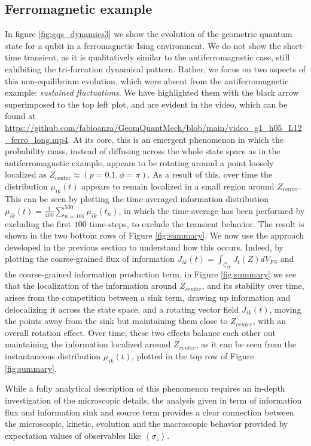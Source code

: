 \documentclass[draft,nofootinbib,pre,twocolumn,showpacs,showkeys,preprintnumbers,floatfix]{revtex4-1}
\newcommand{\CC}[2]{\mathcal{C}_{#1 #2}}
\newcommand{\1}{\mathbbm{1}}
\newcommand{\MV}[1]{\left\langle #1 \right\rangle}
\begin{document}
\subsection*{Ferromagnetic example}
In figure \ref{fig:gqs_dynamics3} we show the evolution of the geometric
quantum state for a qubit in a ferromagnetic Ising environment. We do not
show the short-time transient, as it is qualitatively similar to the antiferromagnetic case,
still exhibiting the tri-furcation dynamical pattern. Rather, we focus on two aspects
of this non-equilibrium evolution, which were absent from the antiferromagnetic example: \emph{sustained 
fluctuations}. We have highlighted them with the black arrow superimposed to the top left
plot, and are evident in the video, which can be found at
\url{https://github.com/fabioanza/GeomQuantMech/blob/main/video_g1_h05_L12_ferro_long.mp4}.
At its core, this is an emergent phenomenon in which the probability mass, instead of
diffusing across the whole state space as in the antiferromagnetic example, appears to be 
rotating around a point loosely localized as $Z_{\mathrm{center}} \approx (p=0.1,\phi=\pi)$. 
As a result of this, over time the distribution $\mu_{ik}(t)$ appears to remain localized in 
a small region around $Z_{\mathrm{center}}$. This can be seen by plotting the time-averaged
information distribution $\overline{\mu_{ik}(t)} = \frac{1}{400}\sum_{n=101}^{500} \mu_{ik}(t_n)$, 
in which the time-average has been performed by excluding the first $100$ time-steps, to 
exclude the transient behavior. The result is shown in the two bottom rows of Figure \ref{fig:summary}.  We now 
use the approach developed in the previous section to understand how this occurs. 
Indeed, by plotting the coarse-grained flux of information $J_{ik}(t) = \int_{\CC{i}{k}}J_t(Z) dV_{FS}$
and the coarse-grained information production term, in Figure \ref{fig:summary} we see that 
the localization of the information around $Z_{center}$, and its stability over time, arises 
from the competition between a sink term, drawing up information and delocalizing it across
the state space, and a rotating vector field $J_{ik}(t)$, moving the points away from the sink 
but maintaining them close to $Z_{center}$, with an overall rotation effect. Over time, these two
effects balance each other out maintaining the information localized around $Z_{center}$, 
as it can be seen from the instantaneous distribution $\mu_{ik}(t)$, plotted in the top
row of Figure \ref{fig:summary}.

While a fully analytical description of this phenomenon requires an in-depth investigation of the 
microscopic details, the analysis given in term of information flux and information sink and source
term provides a clear connection between the microscopic, kinetic, evolution and the macroscopic
behavior provided by expectation values of observables like $\MV{\sigma_z}$.
\end{document}
